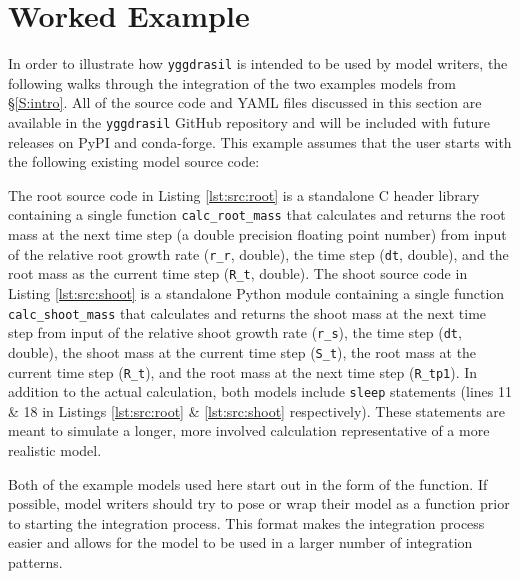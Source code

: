 \documentclass[journal]{IEEEtran}
\newcommand{\pkg}{{\tt yggdrasil}{}}
\newcommand{\rootsrc}{}
\newcommand{\shootsrc}{}
\begin{document}
\section{Worked Example}\label{S:example}
%
In order to illustrate how {\pkg} is intended to be used by model writers, the following walks through the integration of the two examples models from \S\ref{S:intro}. All of the source code and YAML files discussed in this section are available in the {\pkg} GitHub repository and will be included with future releases on PyPI and conda-forge. This example assumes that the user starts with the following existing model source code:
%
\rootsrc
%
\shootsrc
%
The root source code in Listing \ref{lst:src:root} is a standalone C header library containing a single function {\tt calc\_root\_mass} that calculates and returns the root mass at the next time step (a double precision floating point number) from input of the relative root growth rate ({\tt r\_r}, double), the time step ({\tt dt}, double), and the root mass as the current time step ({\tt R\_t}, double).
%
The shoot source code in Listing \ref{lst:src:shoot} is a standalone Python module containing a single function {\tt calc\_shoot\_mass} that calculates and returns the shoot mass at the next time step from input of the relative shoot growth rate ({\tt r\_s}), the time step ({\tt dt}, double), the shoot mass at the current time step ({\tt S\_t}), the root mass at the current time step ({\tt R\_t}), and the root mass at the next time step ({\tt R\_tp1}).
%
In addition to the actual calculation, both models include {\tt sleep} statements (lines 11 \& 18 in Listings \ref{lst:src:root} \& \ref{lst:src:shoot} respectively). These statements are meant to simulate a longer, more involved calculation representative of a more realistic model.

Both of the example models used here start out in the form of the function. If possible, model writers should try to pose or wrap their model as a function prior to starting the integration process. This format makes the integration process easier and allows for the model to be used in a larger number of integration patterns.

\end{document}
